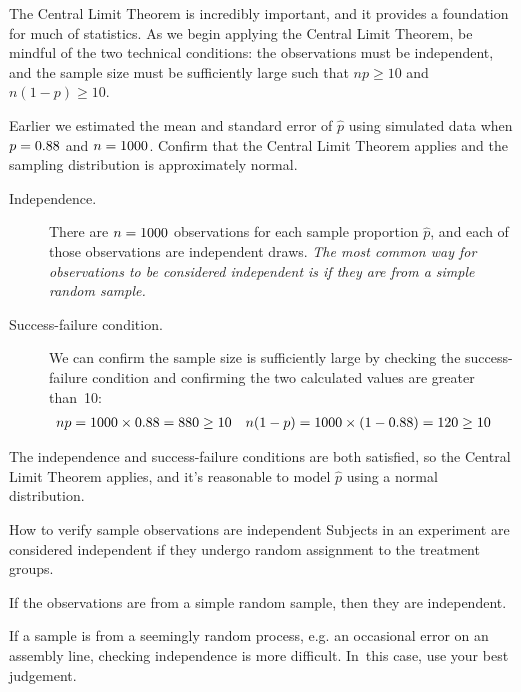 The Central Limit Theorem is incredibly important, and it provides
a foundation for much of statistics.
As we begin applying
the Central Limit Theorem, be mindful of the two
technical conditions:
the observations must be independent, and the sample size must
be sufficiently large such that $np \geq 10$ and $n(1-p) \geq 10$.

\begin{examplewrap}
\begin{nexample}{Earlier we estimated the mean and standard
error of $\hat{p}$ using simulated data when
$p = 0.88{}$ and $n = 1000{}$.
Confirm that the Central Limit Theorem applies
and the sampling  distribution is approximately
normal.}\label{sample_p88_n1000_confirm_normal}
\begin{description}
\item[Independence.] There are $n = 1000{}$
    observations for each
    sample proportion $\hat{p}$, and each of those observations
    are independent draws. \emph{The most common way for
    observations to be considered independent is if they are from
    a simple random sample.}
\item[Success-failure condition.] We can confirm the sample size
    is sufficiently large by checking the success-failure condition
    and confirming the two calculated values are greater than~10:
    \begin{align*}
    np &= 1000{} \times 0.88{}
        = 880{}
        \geq 10
    &n(1-p) &= 1000{} \times (1 - 0.88{})
        = 120{}
        \geq 10
    \end{align*}
\end{description}
The independence and success-failure conditions are both
satisfied, so the Central Limit Theorem applies, and it's
reasonable to model $\hat{p}$ using a normal distribution.
\end{nexample}
\end{examplewrap}

\begin{onebox}{How to verify sample observations are independent}
  Subjects in an experiment are considered independent
  if they undergo random assignment to the treatment
  groups.\stdvspace{}

  If the observations are from a simple random sample,
  then they are independent.\stdvspace{}

  If a sample is from a seemingly random process,
  e.g. an occasional error on an assembly line,
  checking independence is more difficult. In~this case,
  use your best judgement.
\end{onebox}

